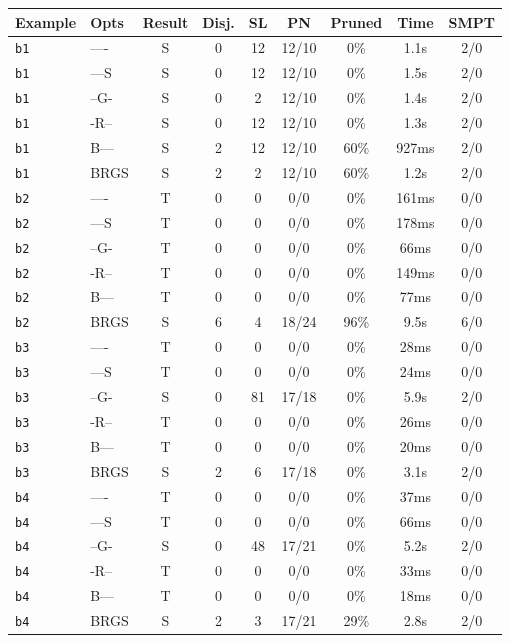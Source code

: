 \begin{tabular}{llccccccc}
\toprule
Example & Opts & Result & Disj. & SL & PN & Pruned & Time & SMPT \\
\midrule
\texttt{b1} & ---- & S & 0 & 12 & 12/10 & 0\% & 1.1s & 2/0 \\
\texttt{b1} & ---S & S & 0 & 12 & 12/10 & 0\% & 1.5s & 2/0 \\
\texttt{b1} & --G- & S & 0 & 2 & 12/10 & 0\% & 1.4s & 2/0 \\
\texttt{b1} & -R-- & S & 0 & 12 & 12/10 & 0\% & 1.3s & 2/0 \\
\texttt{b1} & B--- & S & 2 & 12 & 12/10 & 60\% & 927ms & 2/0 \\
\texttt{b1} & BRGS & S & 2 & 2 & 12/10 & 60\% & 1.2s & 2/0 \\
\texttt{b2} & ---- & T & 0 & 0 & 0/0 & 0\% & 161ms & 0/0 \\
\texttt{b2} & ---S & T & 0 & 0 & 0/0 & 0\% & 178ms & 0/0 \\
\texttt{b2} & --G- & T & 0 & 0 & 0/0 & 0\% & 66ms & 0/0 \\
\texttt{b2} & -R-- & T & 0 & 0 & 0/0 & 0\% & 149ms & 0/0 \\
\texttt{b2} & B--- & T & 0 & 0 & 0/0 & 0\% & 77ms & 0/0 \\
\texttt{b2} & BRGS & S & 6 & 4 & 18/24 & 96\% & 9.5s & 6/0 \\
\texttt{b3} & ---- & T & 0 & 0 & 0/0 & 0\% & 28ms & 0/0 \\
\texttt{b3} & ---S & T & 0 & 0 & 0/0 & 0\% & 24ms & 0/0 \\
\texttt{b3} & --G- & S & 0 & 81 & 17/18 & 0\% & 5.9s & 2/0 \\
\texttt{b3} & -R-- & T & 0 & 0 & 0/0 & 0\% & 26ms & 0/0 \\
\texttt{b3} & B--- & T & 0 & 0 & 0/0 & 0\% & 20ms & 0/0 \\
\texttt{b3} & BRGS & S & 2 & 6 & 17/18 & 0\% & 3.1s & 2/0 \\
\texttt{b4} & ---- & T & 0 & 0 & 0/0 & 0\% & 37ms & 0/0 \\
\texttt{b4} & ---S & T & 0 & 0 & 0/0 & 0\% & 66ms & 0/0 \\
\texttt{b4} & --G- & S & 0 & 48 & 17/21 & 0\% & 5.2s & 2/0 \\
\texttt{b4} & -R-- & T & 0 & 0 & 0/0 & 0\% & 33ms & 0/0 \\
\texttt{b4} & B--- & T & 0 & 0 & 0/0 & 0\% & 18ms & 0/0 \\
\texttt{b4} & BRGS & S & 2 & 3 & 17/21 & 29\% & 2.8s & 2/0 \\

\end{tabular}

